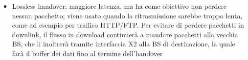 \begin{questions}
\begin{solution}
\begin{itemize}
            \item Lossless handover: maggiore latenza, ma ha come obiettivo non perdere nessun pacchetto; viene usato quando la ritrasmissione sarebbe troppo lenta, come ad esempio per traffico HTTP/FTP. Per evitare di perdere pacchetti in downlink, il flusso in download continuerà a mandare pacchetti alla vecchia BS, che li inoltrerà tramite interfaccia X2 alla BS di destinazione, la quale farà il buffer dei dati fino al termine dell'handover
        \end{itemize}
    \end{solution}
\end{questions}